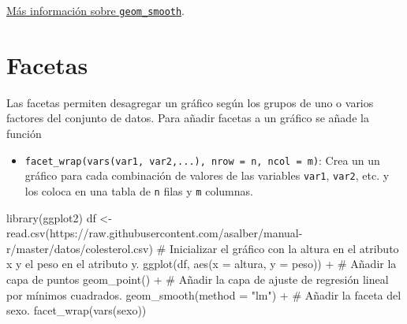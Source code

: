 \documentclass[
  a4paper,
]{scrreport}
\newenvironment{Shaded}{\begin{snugshade}}{\end{snugshade}}
\newcommand{\AttributeTok}[1]{\textcolor[rgb]{0.40,0.45,0.13}{#1}}
\newcommand{\CommentTok}[1]{\textcolor[rgb]{0.37,0.37,0.37}{#1}}
\newcommand{\FunctionTok}[1]{\textcolor[rgb]{0.28,0.35,0.67}{#1}}
\newcommand{\NormalTok}[1]{\textcolor[rgb]{0.00,0.23,0.31}{#1}}
\newcommand{\OtherTok}[1]{\textcolor[rgb]{0.00,0.23,0.31}{#1}}
\newcommand{\SpecialCharTok}[1]{\textcolor[rgb]{0.37,0.37,0.37}{#1}}
\newcommand{\StringTok}[1]{\textcolor[rgb]{0.13,0.47,0.30}{#1}}
\providecommand{\tightlist}{%
  \setlength{\itemsep}{0pt}\setlength{\parskip}{0pt}}\usepackage{longtable,booktabs,array}
\theoremstyle{definition}
\theoremstyle{definition}
\theoremstyle{remark}
\begin{document}
\href{https://ggplot2.tidyverse.org/reference/geom_smooth.html}{Más
información sobre \texttt{geom\_smooth}}.

\hypertarget{facetas}{%
\section{Facetas}\label{facetas}}

Las facetas permiten desagregar un gráfico según los grupos de uno o
varios factores del conjunto de datos. Para añadir facetas a un gráfico
se añade la función

\begin{itemize}
\tightlist
\item
  \texttt{facet\_wrap(vars(var1,\ var2,...),\ nrow\ =\ n,\ ncol\ =\ m)}:
  Crea un un gráfico para cada combinación de valores de las variables
  \texttt{var1}, \texttt{var2}, etc. y los coloca en una tabla de
  \texttt{n} filas y \texttt{m} columnas.
\end{itemize}

\begin{Shaded}
\begin{Highlighting}[]
\FunctionTok{library}\NormalTok{(ggplot2)}
\NormalTok{df }\OtherTok{\textless{}{-}} \FunctionTok{read.csv}\NormalTok{(}\StringTok{\textquotesingle{}https://raw.githubusercontent.com/asalber/manual{-}r/master/datos/colesterol.csv\textquotesingle{}}\NormalTok{)}
\CommentTok{\# Inicializar el gráfico con la altura en el atributo x y el peso en el atributo y.}
\FunctionTok{ggplot}\NormalTok{(df, }\FunctionTok{aes}\NormalTok{(}\AttributeTok{x =}\NormalTok{ altura, }\AttributeTok{y =}\NormalTok{ peso)) }\SpecialCharTok{+}
\CommentTok{\# Añadir la capa de puntos}
    \FunctionTok{geom\_point}\NormalTok{() }\SpecialCharTok{+}
\CommentTok{\# Añadir la capa de ajuste de regresión lineal por mínimos cuadrados.}
    \FunctionTok{geom\_smooth}\NormalTok{(}\AttributeTok{method =} \StringTok{"lm"}\NormalTok{) }\SpecialCharTok{+}
\CommentTok{\# Añadir la faceta del sexo.}
    \FunctionTok{facet\_wrap}\NormalTok{(}\FunctionTok{vars}\NormalTok{(sexo))}
\end{Highlighting}
\end{Shaded}
\end{document}
